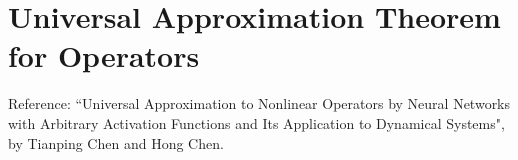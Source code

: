\chapter{Universal Approximation Theorem for Operators}\label{ffa16de}

\def\TW{\mathcal{T}\rule{-3pt}{0em}\mathcal{W}}

Reference: ``Universal Approximation to Nonlinear Operators by Neural Networks
with Arbitrary Activation Functions and Its Application to Dynamical Systems",
by Tianping Chen and Hong Chen.

\begin{toc}
\end{toc}


\nextsection
{}

\nextsection
{}
